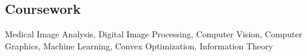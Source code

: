 \documentclass[margin,line]{res}
\newenvironment{list1}{
  \begin{list}{\ding{113}}{%
      \setlength{\itemsep}{0in}
      \setlength{\parsep}{0in} \setlength{\parskip}{0in}
      \setlength{\topsep}{0in} \setlength{\partopsep}{0in} 
      \setlength{\leftmargin}{0.17in}}}{\end{list}}
\begin{document}
\begin{resume}
\section{\sc Coursework} 
Medical Image Analysis, Digital Image Processing, Computer Vision, Computer Graphics, Machine Learning, Convex Optimization, Information Theory

%
\vspace*{-0.13in} 


\end{resume}
\end{document}
